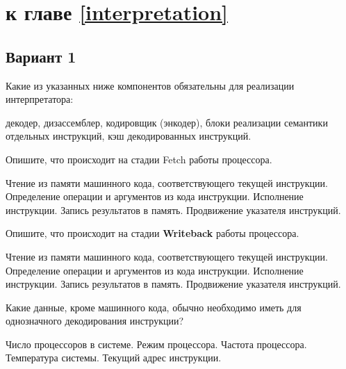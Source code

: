 
\section{\Questions к главе \ref{interpretation}} %

\subsection*{Вариант 1}

\begin{questions}
\question[1] Какие из указанных ниже компонентов обязательны для реализации интерпретатора:
\begin{choices}
    \correctchoice декодер,
    \choice дизассемблер,
    \choice кодировщик (энкодер),
    \correctchoice блоки реализации семантики отдельных инструкций,
    \choice кэш декодированных инструкций.
\end{choices}

\question[3] Опишите, что происходит на стадии Fetch работы процессора.
\begin{choices}
    \correctchoice Чтение из памяти машинного кода, соответствующего текущей инструкции.
    \choice Определение операции и аргументов из кода инструкции.
    \choice Исполнение инструкции.
    \choice Запись результатов в память.
    \choice Продвижение указателя инструкций.
\end{choices}

\question[3] Опишите, что происходит на стадии \textbf{Writeback} работы процессора. %
\begin{choices}
    \choice Чтение из памяти машинного кода, соответствующего текущей инструкции.
    \choice Определение операции и аргументов из кода инструкции.
    \choice Исполнение инструкции.
    \correctchoice Запись результатов в память.
    \choice Продвижение указателя инструкций.
\end{choices}

\question[3] Какие данные, кроме машинного кода, обычно необходимо иметь для однозначного декодирования инструкции?
\begin{choices}
    \choice Число процессоров в системе.
    \correctchoice Режим процессора.
    \choice Частота процессора.
    \choice Температура системы.
    \correctchoice Текущий адрес инструкции.
\end{choices}


\end{questions}
